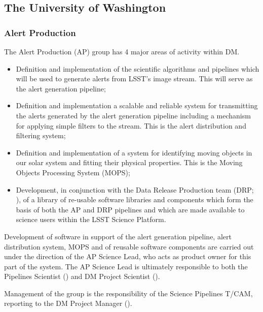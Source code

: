 \subsection {The University of Washington\label{sect:uw}}

\subsubsection{Alert Production\label{sect:ap}}

The Alert Production (AP) group has 4 major areas of activity within DM.

\begin{itemize}

  \item{Definition and implementation of the scientific algorithms and pipelines which will be used to generate alerts from LSST's image stream.  This will serve as the alert generation pipeline;}

  \item{Definition and implementation a scalable and reliable system for transmitting the alerts generated by the alert generation pipeline including a mechanism for applying simple filters to the stream. This is the alert distribution and filtering system;}

  \item{Definition and implementation of a system for identifying moving objects in our solar system and fitting their physical properties. This is the Moving Objects Processing System (MOPS);}

  \item{Development, in conjunction with the Data Release Production team (DRP; ), of a library of re-usable software libraries and components which form the basis of both the AP and DRP pipelines and which are made available to science users within the LSST Science Platform.}

\end{itemize}

Development of software in support of the alert generation pipeline, alert distribution system, MOPS and of reusable software components are carried out under the direction of the AP Science Lead, who acts as product owner for this part of the system.
The AP Science Lead is ultimately responsible to both the Pipelines Scientist () and DM Project Scientist ().

Management of the group is the responsibility of the Science Pipelines T/CAM, reporting to the DM Project Manager ().


